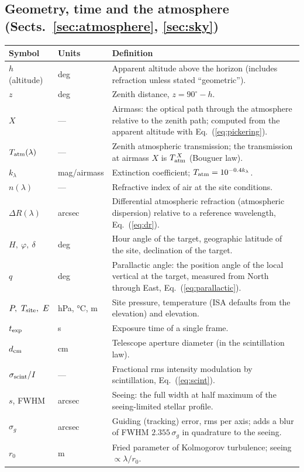\subsection*{Geometry, time and the atmosphere
(Sects.~\ref{sec:atmosphere}, \ref{sec:sky})}

\begin{tabular}{llp{8.6cm}}
\toprule
Symbol & Units & Definition \\
\midrule
$h$ (altitude) & deg & Apparent altitude above the horizon (includes
  refraction unless stated ``geometric''). \\
$z$ & deg & Zenith distance, $z = 90^\circ - h$. \\
$X$ & — & Airmass: the optical path through the atmosphere relative to the
  zenith path; computed from the apparent altitude with
  Eq.~(\ref{eq:pickering}). \\
$T_{\rm atm}(\lambda)$ & — & Zenith atmospheric transmission; the
  transmission at airmass $X$ is $T_{\rm atm}^{\,X}$ (Bouguer law). \\
$k_\lambda$ & mag/airmass & Extinction coefficient;
  $T_{\rm atm} = 10^{-0.4 k_\lambda}$. \\
$n(\lambda)$ & — & Refractive index of air at the site conditions. \\
$\Delta R(\lambda)$ & arcsec & Differential atmospheric refraction
  (atmospheric dispersion) relative to a reference wavelength,
  Eq.~(\ref{eq:dr}). \\
$H,\ \varphi,\ \delta$ & deg & Hour angle of the target, geographic
  latitude of the site, declination of the target. \\
$q$ & deg & Parallactic angle: the position angle of the local vertical at
  the target, measured from North through East, Eq.~(\ref{eq:parallactic}). \\
$P,\ T_{\rm site},\ E$ & hPa, \si{\celsius}, m & Site pressure,
  temperature (ISA defaults from the elevation) and elevation. \\
$t_{\rm exp}$ & s & Exposure time of a single frame. \\
$d_{\rm cm}$ & cm & Telescope aperture diameter (in the scintillation
  law). \\
$\sigma_{\rm scint}/I$ & — & Fractional rms intensity modulation by
  scintillation, Eq.~(\ref{eq:scint}). \\
$s$, FWHM & arcsec & Seeing: the full width at half maximum of the
  seeing-limited stellar profile. \\
$\sigma_g$ & arcsec & Guiding (tracking) error, rms per axis; adds a blur
  of FWHM $2.355\,\sigma_g$ in quadrature to the seeing. \\
$r_0$ & m & Fried parameter of Kolmogorov turbulence;
  seeing $\propto \lambda/r_0$. \\
\bottomrule
\end{tabular}

